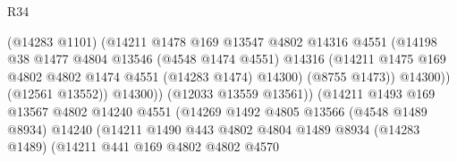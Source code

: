 \begin{lexlean}{R34}
\begin{coremodule}
                                        (@14283 @1101)
                                        (@14211
                                          @1478
                                          @169
                                          @13547
                                          @4802
                                          @14316
                                          @4551
                                          (@14198
                                            @38
                                            @1477
                                            @4804
                                            @13546
                                            (@4548 @1474 @4551)
                                            @14316
                                            (@14211
                                              @1475
                                              @169
                                              @4802
                                              @4802
                                              @1474
                                              @4551
                                              (@14283 @1474)
                                              @14300)
                                            (@8755 @1473))
                                          @14300))
                                      (@12561 @13552))
                                    @14300))
                                (@12033 @13559 @13561))
                              (@14211
                                @1493
                                @169
                                @13567
                                @4802
                                @14240
                                @4551
                                (@14269
                                  @1492
                                  @4805
                                  @13566
                                  (@4548 @1489 @8934)
                                  @14240
                                  (@14211
                                    @1490
                                    @443
                                    @4802
                                    @4804
                                    @1489
                                    @8934
                                    (@14283 @1489)
                                    (@14211
                                      @441
                                      @169
                                      @4802
                                      @4802
                                      @4570

\end{coremodule}
\end{lexlean}
